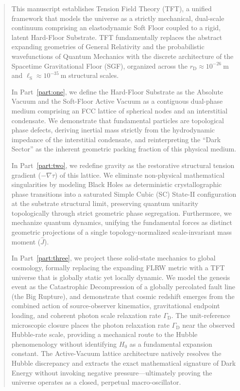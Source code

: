 \documentclass[11pt, letterpaper]{report}
\begin{document}
\begin{abstract}
This manuscript establishes Tension Field Theory (TFT), a unified framework that models the universe as a strictly mechanical, dual-scale continuum comprising an elastodynamic Soft Floor coupled to a rigid, latent Hard-Floor Substrate. TFT fundamentally replaces the abstract expanding geometries of General Relativity and the probabilistic wavefunctions of Quantum Mechanics with the discrete architecture of the Spacetime Gravitational Floor (SGF), organized across the $r_{\mathrm{D}} \approx 10^{-26}\ \mathrm{m}$ and $\ell_{\mathrm{S}} \approx 10^{-35}\ \mathrm{m}$ structural scales.

In Part~\ref{part:one}, we define the Hard-Floor Substrate as the Absolute Vacuum and the Soft-Floor Active Vacuum as a contiguous dual-phase medium comprising an FCC lattice of spherical nodes and an interstitial condensate. We demonstrate that fundamental particles are topological phase defects, deriving inertial mass strictly from the hydrodynamic impedance of the interstitial condensate, and reinterpreting the ``Dark Sector'' as the inherent geometric packing fraction of this physical medium.

In Part~\ref{part:two}, we redefine gravity as the restorative structural tension gradient ($-\nabla\tau$) of this lattice. We eliminate non-physical mathematical singularities by modeling Black Holes as deterministic crystallographic phase transitions into a saturated Simple Cubic (SC) State-II configuration at the substrate structural limit, preserving quantum unitarity topologically through strict geometric phase segregation. Furthermore, we mechanize quantum dynamics, unifying the fundamental forces as distinct geometric projections of a single topology-normalized scale-invariant mass moment ($\hat{J}$).

In Part~\ref{part:three}, we project these solid-state mechanics to global cosmology, formally replacing the expanding FLRW metric with a TFT universe that is globally static yet locally dynamic. We model the genesis event as the Catastrophic Decompression of a globally percolated fault line (the Big Rupture), and demonstrate that cosmic redshift emerges from the combined action of source-observer kinematics, gravitational endpoint loading, and coherent photon scale relaxation rate $\Gamma_{\mathrm D}$. The unit-reference microscopic closure places the photon relaxation rate $\Gamma_{\mathrm D}$ near the observed Hubble-rate scale, providing a mechanical route to the Hubble phenomenology without identifying $H_0$ as a fundamental expansion constant. The Active-Vacuum lattice architecture natively resolves the Hubble discrepancy and extracts the exact mathematical signature of Dark Energy without invoking negative pressure---ultimately proving the universe operates as a closed, perpetual macro-oscillator.
\end{abstract}
\end{document}
